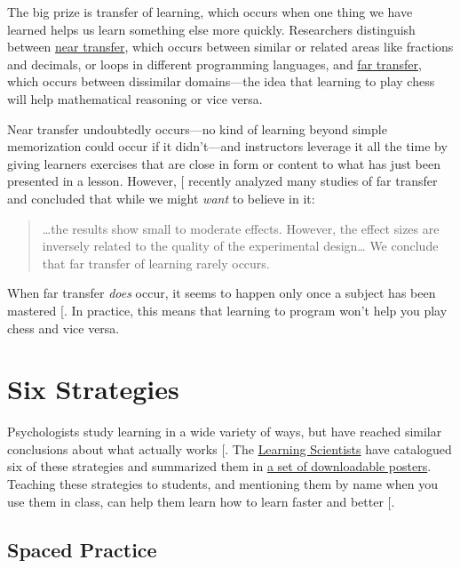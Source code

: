 The big prize is transfer of learning, which occurs when one thing we
have learned helps us learn something else more quickly. Researchers
distinguish between \protect\hyperlink{g:near-transfer}{near transfer}, which occurs
between similar or related areas like fractions and decimals, or loops
in different programming languages, and \protect\hyperlink{g:far-transfer}{far
transfer}, which occurs between dissimilar
domains---the idea that learning to play chess will help mathematical
reasoning or vice versa.

Near transfer undoubtedly occurs---no kind of learning beyond simple
memorization could occur if it didn't---and instructors leverage it all
the time by giving learners exercises that are close in form or content
to what has just been presented in a lesson. However, {[}\protect[\hyperlink{b:Sala2017}{Sala2017}]{]}
recently analyzed many studies of far transfer and concluded that while
we might \emph{want} to believe in it:

\begin{quote}\setlength{\parindent}{0pt}
\ldots{}the results show small to moderate effects. However, the
effect sizes are inversely related to the quality of the experimental
design\ldots{} We conclude that far transfer of learning rarely
occurs.
\end{quote}

When far transfer \emph{does} occur, it seems to happen only once a subject
has been mastered {[}\protect[\hyperlink{b:Gick1987}{Gick1987}]{]}. In practice, this means that
learning to program won't help you play chess and vice versa.

\section{Six Strategies}\label{s:individual-strategies}

Psychologists study learning in a wide variety of ways, but have
reached similar conclusions about what actually works
{[}\protect[\hyperlink{b:Mark2018}{Mark2018}]{]}. The \href{http://www.learningscientists.org/}{Learning Scientists}
have catalogued six of these strategies and summarized them in \href{http://www.learningscientists.org/downloadable-materials}{a set
of downloadable posters}. Teaching
these strategies to students, and mentioning them by name when you use
them in class, can help them learn how to learn faster and better
{[}\protect[\hyperlink{b:Wein2018}{Wein2018}]{]}.

\subsection{Spaced Practice}\label{spaced-practice}

